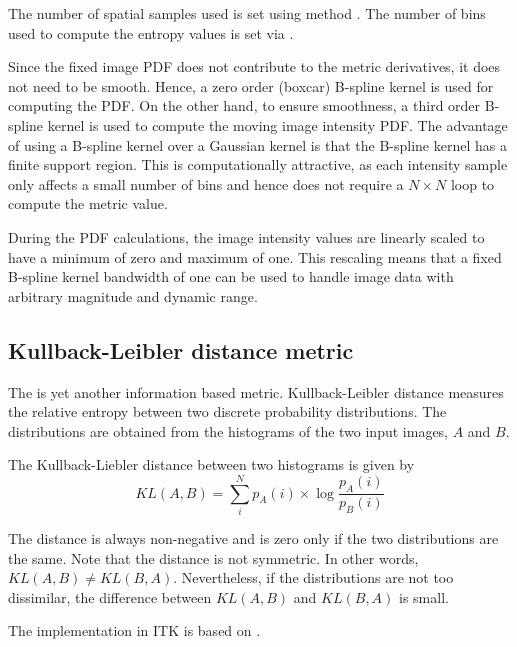 
The number of spatial samples used is set using method
. The number of bins used to compute
the entropy values is set via .

Since the fixed image PDF does not contribute to the metric derivatives, it
does not need to be smooth. Hence, a zero order (boxcar) B-spline kernel is
used for computing the PDF. On the other hand, to ensure smoothness, a third
order B-spline kernel is used to compute the moving image intensity PDF. The
advantage of using a B-spline kernel over a Gaussian kernel is that the
B-spline kernel has a finite support region. This is computationally
attractive, as each intensity sample only affects a small number of bins and
hence does not require a $N \times N$ loop to compute the metric value.

During the PDF calculations, the image intensity values are linearly scaled
to have a minimum of zero and maximum of one. This rescaling means that a
fixed B-spline kernel bandwidth of one can be used to handle image data with
arbitrary magnitude and dynamic range.


\subsection{Kullback-Leibler distance metric}
The  is yet another information based metric.
Kullback-Leibler distance measures the relative entropy between two
discrete probability distributions. The distributions are obtained from the
histograms of the two input images, $A$ and $B$.

The Kullback-Liebler distance between two histograms is given by
\begin{equation}
KL(A,B) =  \sum_i^N p_A(i) \times \log \frac{ p_A(i) }{p_B(i) }
\end{equation}

The distance is always non-negative and is zero only if the two distributions
are the same. Note that the distance is not symmetric. In other
words, $KL(A,B) \neq KL(B,A)$. Nevertheless, if the distributions are not too dissimilar,
the difference between $KL(A,B)$ and $KL(B,A)$ is small.

The implementation in ITK is based on \cite{Chung2002}.

